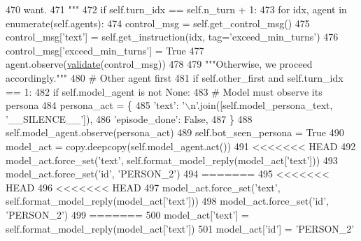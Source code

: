 \begin{DoxyCode}
470 \textcolor{stringliteral}{        want.}
471 \textcolor{stringliteral}{        """}
472         \textcolor{keywordflow}{if} self.turn\_idx == self.n\_turn + 1:
473             \textcolor{keywordflow}{for} idx, agent \textcolor{keywordflow}{in} enumerate(self.agents):
474                 control\_msg = self.get\_control\_msg()
475                 control\_msg[\textcolor{stringliteral}{'text'}] = self.get\_instruction(idx, tag=\textcolor{stringliteral}{'exceed\_min\_turns'})
476                 control\_msg[\textcolor{stringliteral}{'exceed\_min\_turns'}] = \textcolor{keyword}{True}
477                 agent.observe(\hyperlink{namespaceparlai_1_1core_1_1worlds_afc3fad603b7bce41dbdc9cdc04a9c794}{validate}(control\_msg))
478 
479         \textcolor{stringliteral}{"""Otherwise, we proceed accordingly."""}
480         \textcolor{comment}{# Other agent first}
481         \textcolor{keywordflow}{if} self.other\_first \textcolor{keywordflow}{and} self.turn\_idx == 1:
482             \textcolor{keywordflow}{if} self.model\_agent \textcolor{keywordflow}{is} \textcolor{keywordflow}{not} \textcolor{keywordtype}{None}:
483                 \textcolor{comment}{# Model must observe its persona}
484                 persona\_act = \{
485                     \textcolor{stringliteral}{'text'}: \textcolor{stringliteral}{'\(\backslash\)n'}.join([self.model\_persona\_text, \textcolor{stringliteral}{'\_\_SILENCE\_\_'}]),
486                     \textcolor{stringliteral}{'episode\_done'}: \textcolor{keyword}{False},
487                 \}
488                 self.model\_agent.observe(persona\_act)
489                 self.bot\_seen\_persona = \textcolor{keyword}{True}
490                 model\_act = copy.deepcopy(self.model\_agent.act())
491 <<<<<<< HEAD
492                 model\_act.force\_set(\textcolor{stringliteral}{'text'}, self.format\_model\_reply(model\_act[\textcolor{stringliteral}{'text'}]))
493                 model\_act.force\_set(\textcolor{stringliteral}{'id'}, \textcolor{stringliteral}{'PERSON\_2'})
494 =======
495 <<<<<<< HEAD
496 <<<<<<< HEAD
497                 model\_act.force\_set(\textcolor{stringliteral}{'text'}, self.format\_model\_reply(model\_act[\textcolor{stringliteral}{'text'}]))
498                 model\_act.force\_set(\textcolor{stringliteral}{'id'}, \textcolor{stringliteral}{'PERSON\_2'})
499 =======
500                 model\_act[\textcolor{stringliteral}{'text'}] = self.format\_model\_reply(model\_act[\textcolor{stringliteral}{'text'}])
501                 model\_act[\textcolor{stringliteral}{'id'}] = \textcolor{stringliteral}{'PERSON\_2'}

\end{DoxyCode}
